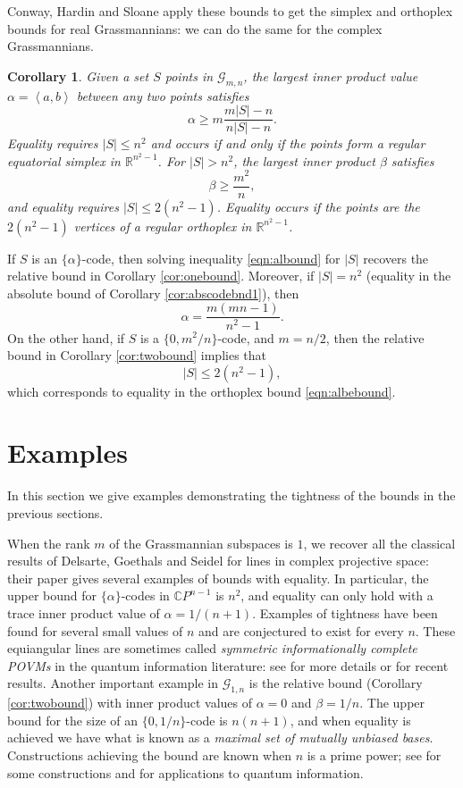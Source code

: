 \documentclass[12pt]{article}
\numberwithin{equation}{section}
\theoremstyle{plainsl}
\newtheorem{corollary}[theorem]{Corollary}
\newcommand\defn[1]{\textsl{#1}}
\newcommand\al{\alpha}
\newcommand\be{\beta}
\newcommand\cx{{\mathbb C}}%
\newcommand\re{{\mathbb R}}%
\newcommand\gras[2]{\mathcal{G}_{#1,#2}}
\newcommand\ip[2]{\left\langle#1,#2\right\rangle}
\begin{document}
Conway, Hardin and Sloane \cite{chs} apply these bounds to get the simplex and orthoplex bounds for real Grassmannians: we can do the same for the complex Grassmannians.

\begin{corollary}
\label{cor:simortho}
Given a set $S$ points in $\gras{m}{n}$, the largest inner product value $\al = \ip{a}{b}$ between any two points satisfies 
\begin{equation}
\al \geq m\frac{m|S|-n}{n|S|-n}.
\label{eqn:albound}
\end{equation}
Equality requires $|S| \leq n^2$ and occurs if and only if the points form a regular equatorial simplex in $\re^{n^2-1}$. For $|S| > n^2$, the largest inner product $\be$ satisfies
\begin{equation}
\be \geq \frac{m^2}{n},
\label{eqn:albebound}
\end{equation}
and equality requires $|S| \leq 2(n^2-1)$. Equality occurs if the points are the $2(n^2-1)$ vertices of a regular orthoplex in $\re^{n^2-1}$.
\end{corollary}

If $S$ is an $\{\al\}$-code, then solving inequality \eqref{eqn:albound} for $|S|$ recovers the relative bound in Corollary \ref{cor:onebound}. Moreover, if $|S| = n^2$ (equality in the absolute bound of Corollary \ref{cor:abscodebnd1}), then
\[
\al = \frac{m(mn-1)}{n^2-1}.
\]
On the other hand, if $S$ is a $\{0,m^2/n\}$-code, and $m = n/2$, then the relative bound in Corollary \ref{cor:twobound} implies that 
\[
|S| \leq 2(n^2-1),
\]
which corresponds to equality in the orthoplex bound \eqref{eqn:albebound}.

\section{Examples}
\label{sec:examples}

In this section we give examples demonstrating the tightness of the bounds in the previous sections.

When the rank $m$ of the Grassmannian subspaces is $1$, we recover all the classical results of Delsarte, Goethals and Seidel \cite{dgs} for lines in complex projective space: their paper gives several examples of bounds with equality. In particular, the upper bound for $\{\al\}$-codes in $\cx P^{n-1}$ is $n^2$, and equality can only hold with a trace inner product value of $\al = 1/(n+1)$. Examples of tightness have been found for several small values of $n$ and are conjectured to exist for every $n$. These equiangular lines are sometimes called \defn{symmetric informationally complete POVMs} in the quantum information literature: see \cite{rbsc} for more details or \cite{kha} for recent results. Another important example in $\gras{1}{n}$ is the relative bound (Corollary \ref{cor:twobound}) with inner product values of $\al = 0$ and $\be = 1/n$. The upper bound for the size of an $\{0,1/n\}$-code is $n(n+1)$, and when equality is achieved we have what is known as a \defn{maximal set of mutually unbiased bases}. Constructions achieving the bound are known when $n$ is a prime power; see \cite{gr1} for some constructions and \cite{rs1} for applications to quantum information.
\end{document}
